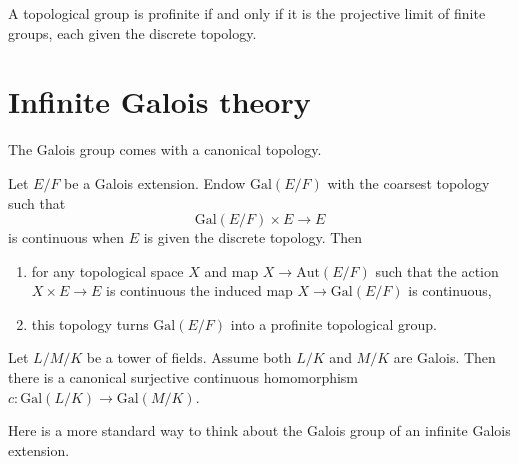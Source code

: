\begin{theorem}
	A topological group is profinite if and only if it is the projective limit of finite groups, each given the discrete topology.
\end{theorem}



\chapter{Infinite Galois theory}
\label{section-infinite-galois}

\noindent
The Galois group comes with a canonical topology.

\begin{lemma}\cite[\href{https://stacks.math.columbia.edu/tag/0BMJ}{Lemma 0BMJ}]{stacks-project}
	\label{lemma-galois-profinite}
	Let $E/F$ be a Galois extension. Endow $\text{Gal}(E/F)$ with the coarsest
	topology such that
	$$
	\text{Gal}(E/F) \times E \longrightarrow E
	$$
	is continuous when $E$ is given the discrete topology. Then
	\begin{enumerate}
		\item for any topological space $X$ and map $X \to \text{Aut}(E/F)$
		such that the action $X \times E \to E$ is continuous the induced map
		$X \to \text{Gal}(E/F)$ is continuous,
		\item this topology turns $\text{Gal}(E/F)$ into
		a profinite topological group.
	\end{enumerate}
\end{lemma}



\begin{lemma}\cite[\href{https://stacks.math.columbia.edu/tag/0BMK}{Lemma 0BMK}]{stacks-project}
	\label{lemma-galois-infinite}
	Let $L/M/K$ be a tower of fields. Assume both $L/K$ and
	$M/K$ are Galois. Then there is a canonical surjective continuous
	homomorphism $c : \text{Gal}(L/K) \to \text{Gal}(M/K)$.
\end{lemma}



\noindent
Here is a more standard way to think about
the Galois group of an infinite Galois extension.

